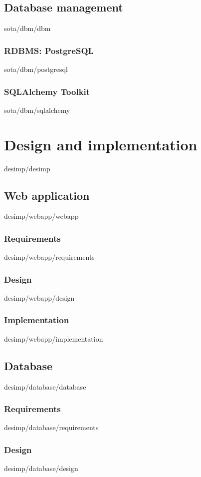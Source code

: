 \documentclass[english,epsbased,copyright,final,printable,covers,extendedindex,firstnumbered,tfg,gnuplot]{tfgtfmthesisuam}
\begin{document}
  \section{Database management\label{SEC:DBM}}{sota/dbm/dbm}
    \subsection{RDBMS: PostgreSQL\label{SS:POSTGRESQL}}{sota/dbm/postgresql}
    \subsection{SQLAlchemy Toolkit\label{SS:SQLALCHEMY}}{sota/dbm/sqlalchemy}

\chapter{Design and implementation\label{CAP:DESIMP}}{desimp/desimp}
  \section{Web application\label{SEC:WEBAPP_DESIMP}}{desimp/webapp/webapp}
    \subsection{Requirements\label{SS:WEBAPP_REQ}}{desimp/webapp/requirements}
    \subsection{Design\label{SS:WEBAPP_DES}}{desimp/webapp/design}
    \subsection{Implementation\label{SS:WEBAPP_IMP}}{desimp/webapp/implementation}
  \section{Database\label{SEC:DATABASE_DESIMP}}{desimp/database/database}
    \subsection{Requirements\label{SS:DATABASE_REQ}}{desimp/database/requirements}
    \subsection{Design\label{SS:DATABASE_DES}}{desimp/database/design}
\end{document}
